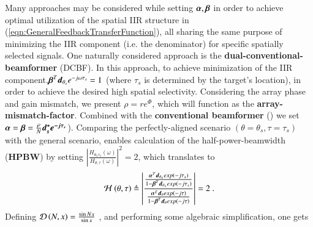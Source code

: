 Many approaches may be considered while setting $\boldsymbol{\alpha},\boldsymbol{\beta}$ in order to achieve optimal utilization of the spatial IIR structure in (\ref{eqn:GeneralFeedbackTransferFunction}), all sharing the same purpose of minimizing the IIR component (i.e. the denominator) for specific spatially selected signals.
One naturally considered approach is the \textbf{dual-conventional-beamformer} (DCBF). In this approach, to achieve minimization of the IIR component,$ \boldsymbol{\beta}^{T}\boldsymbol{d}_{\theta_{s}}e^{-j\omega\tau_{s}} = 1 $ (where $\tau_{s}$ is determined by the target's location), in order to achieve the desired high spatial selectivity. Considering the array phase and gain mismatch, we present $\rho = re^{\Phi}$, which will function as the \textbf{array-mismatch-factor}. Combined with the \textbf{conventional beamformer} (\cite{VanTrees2002DetectionIV}) we set $ \boldsymbol{\alpha} = \boldsymbol{\beta} = \frac{\rho}{N}\boldsymbol{d^{*}_{s}e^{-j\tau_{s}}} $). Comparing the perfectly-aligned scenario $\left(\theta = \theta_{s}, \tau = \tau_{s}\right)$ with the general scenario, enables calculation of the half-power-beamwidth (\textbf{HPBW}) by setting $\left|\frac{H_{\theta_{s}\tau_{s}}\left(\omega{}\right)}{H_{\theta,\tau}\left(\omega{}\right)}\right|^{2} = 2$, which translates to 
\begin{align}
\label{eqn_arrPerformance_beamwidth_3dB}
\Hr{\theta}{\tau}{}
\triangleq
\fbBpRatio
=
2\ .
\end{align}
Defining $\mathcal{D}\left(N,x\right) = \frac{\sin{Nx}}{\sin{x}}$ , and performing some algebraic simplification, one gets
\ifdefined\showDev
    \\
